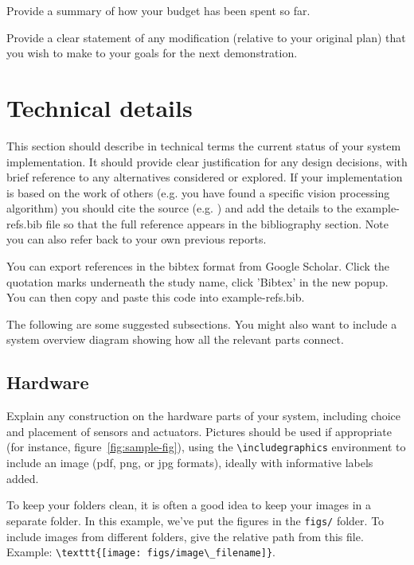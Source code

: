 \documentclass{article}
\begin{document}
Provide a summary of how your budget has been spent so far.

Provide a clear statement of any modification (relative to your original plan) that you wish to make to your goals for the next demonstration.

\section{Technical details}

This section should describe in technical terms the current status of your system implementation. It should provide clear justification for any design decisions, with brief reference to any alternatives considered or explored. If your implementation is based on the work of others (e.g. you have found a specific vision processing algorithm) you should cite the source (e.g. \cite{Newell81}) and add the details to the example-refs.bib file so that the full reference appears in the bibliography section. Note you can also refer back to your own previous reports. 

You can export references in the bibtex format from Google Scholar. Click the quotation marks underneath the study name, click 'Bibtex' in the new popup. You can then copy and paste this code into example-refs.bib.

The following are some suggested subsections. You might also want to include a system overview diagram showing how all the relevant parts connect. 

\subsection{Hardware}

Explain any construction on the hardware parts of your system, including choice and placement of sensors and actuators. Pictures should be used if appropriate (for instance, figure~\ref{fig:sample-fig}), using the \verb+\includegraphics+ environment to include an image (pdf, png, or jpg formats), ideally with informative labels added. 

To keep your folders clean, it is often a good idea to keep your images in a separate folder. In this example, we've put the figures in the \texttt{figs/} folder. To include images from different folders, give the relative path from this file. Example: \verb+\texttt{[image: figs/image\_filename]}+.

\end{document}
